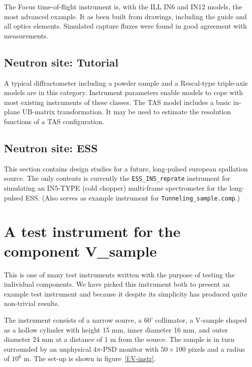 The Focus time-of-flight instrument is, with the ILL IN6 and IN12 models, the most advanced example. It as been built from drawings, including the guide and all optics elements. Simulated capture fluxes were found in good agreement with measurements.

\subsection{Neutron site: Tutorial}

A typical diffractometer including a powder sample and a Rescal-type triple-axis models are in this category. Instrument parameters enable models to cope with most existing instruments of these classes. The TAS model includes a basic in-plane UB-matrix transformation. It may be used to estimate the resolution functions of a TAS configuration.

\subsection{Neutron site: ESS}

This section contains design studies for a future, long-pulsed european spallation source. The only contents is currently the \verb+ESS_IN5_reprate+ instrument for simulating an IN5-TYPE (cold chopper) multi-frame spectrometer for the long-pulsed ESS. (Also serves as example instrument for \verb+Tunneling_sample.comp+.)

\section{A test instrument for the component V\_sample}
\label{s:V-instr}
This is one of many test instruments written with the
purpose of testing the individual components. We have picked
this instrument both to present an
example test instrument and because it despite its simplicity
has produced quite non-trivial results.

The instrument consists of a narrow source,
a 60' collimator, a V-sample shaped as a hollow cylinder
with height 15 mm, inner diameter 16 mm, and outer diameter 24 mm
at a distance of 1 m from the source.
The sample is in turn surrounded by an unphysical $4\pi$-PSD
monitor with $50 \times 100$ pixels and a radius of $10^{6}$ m.
The set-up is shown in figure~\ref{f:V-instr}.

